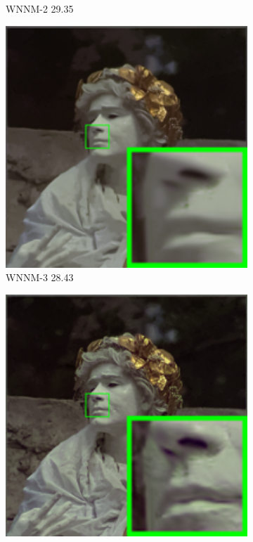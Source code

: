 \begin{figure}
\begin{subfigure}[t]{0.19\textwidth}
		\caption{WNNM-2 29.35}
    \end{subfigure}
    \hfill
    \begin{subfigure}[t]{0.19\textwidth}
        \centering
        \includegraphics[width=1\textwidth]{images/mcwnnm/24images/resize_br_WNNM_ADMM_nSig301050_kodim17.png}
		\caption{WNNM-3 28.43}
    \end{subfigure}
    \hfill
    \begin{subfigure}[t]{0.19\textwidth}
        \centering
        \includegraphics[width=1\textwidth]{images/mcwnnm/24images/resize_br_CWNNM_ADMM_nSig301050_kodim17.png}

\end{subfigure}
\end{figure}
